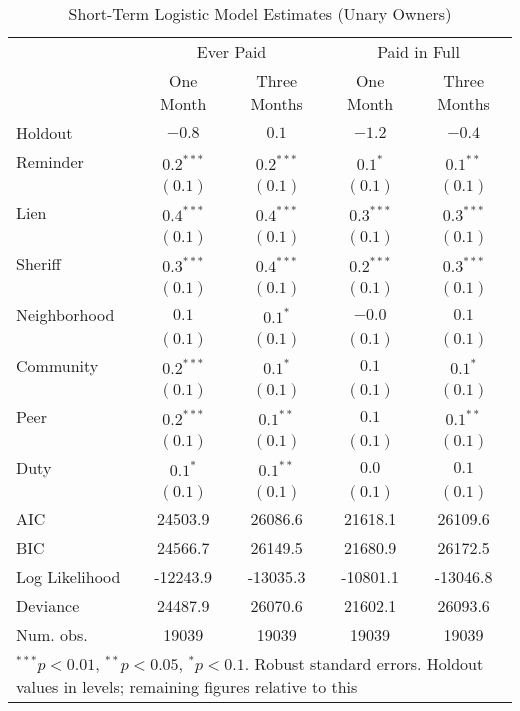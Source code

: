 \begin{table}[htbp]
\caption{Short-Term Logistic Model Estimates (Unary Owners)}
\begin{center}
\begin{tabular}{l c c c c }
\hline
 & \multicolumn{2}{c}{Ever Paid} & \multicolumn{2}{c}{Paid in Full} \\
 & One Month & Three Months & One Month & Three Months \\
Holdout        & $-0.8$ & $0.1$       & $-1.2$ & $-0.4$ \\
\hline
Reminder       & $0.2^{***}$  & $0.2^{***}$ & $0.1^{*}$    & $0.1^{**}$   \\
               & $(0.1)$      & $(0.1)$     & $(0.1)$      & $(0.1)$      \\
Lien           & $0.4^{***}$  & $0.4^{***}$ & $0.3^{***}$  & $0.3^{***}$  \\
               & $(0.1)$      & $(0.1)$     & $(0.1)$      & $(0.1)$      \\
Sheriff        & $0.3^{***}$  & $0.4^{***}$ & $0.2^{***}$  & $0.3^{***}$  \\
               & $(0.1)$      & $(0.1)$     & $(0.1)$      & $(0.1)$      \\
Neighborhood   & $0.1$        & $0.1^{*}$   & $-0.0$       & $0.1$        \\
               & $(0.1)$      & $(0.1)$     & $(0.1)$      & $(0.1)$      \\
Community      & $0.2^{***}$  & $0.1^{*}$   & $0.1$        & $0.1^{*}$    \\
               & $(0.1)$      & $(0.1)$     & $(0.1)$      & $(0.1)$      \\
Peer           & $0.2^{***}$  & $0.1^{**}$  & $0.1$        & $0.1^{**}$   \\
               & $(0.1)$      & $(0.1)$     & $(0.1)$      & $(0.1)$      \\
Duty           & $0.1^{*}$    & $0.1^{**}$  & $0.0$        & $0.1$        \\
               & $(0.1)$      & $(0.1)$     & $(0.1)$      & $(0.1)$      \\
\hline
AIC            & 24503.9      & 26086.6     & 21618.1      & 26109.6      \\
BIC            & 24566.7      & 26149.5     & 21680.9      & 26172.5      \\
Log Likelihood & -12243.9     & -13035.3    & -10801.1     & -13046.8     \\
Deviance       & 24487.9      & 26070.6     & 21602.1      & 26093.6      \\
Num. obs.      & 19039        & 19039       & 19039        & 19039        \\
\hline
\multicolumn{5}{l}{\scriptsize{$^{***}p<0.01$, $^{**}p<0.05$, $^*p<0.1$. Robust standard errors. Holdout values in levels; remaining figures relative to this}}
\end{tabular}
\label{sh_logit}
\end{center}
\end{table}

